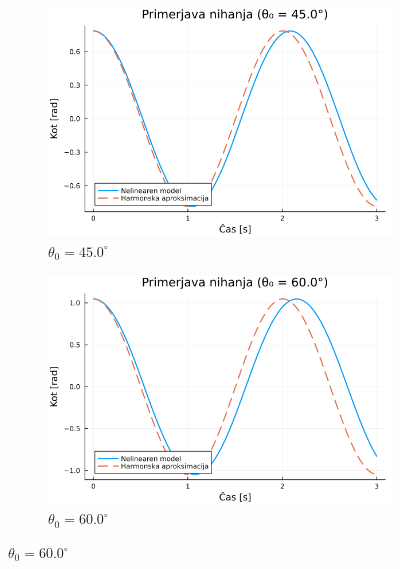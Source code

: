 \documentclass{article}
\begin{document}
\begin{figure}[h!]
    \begin{subfigure}[b]{0.49\textwidth}
        \includegraphics[width=\textwidth]{../slike/primerjava_0.79.png}
        \caption{$\theta_0 = 45.0^\circ$}
        \label{fig:comp45}
    \end{subfigure}
    \hfill
    \begin{subfigure}[b]{0.49\textwidth}
        \includegraphics[width=\textwidth]{../slike/primerjava_1.05.png}
        \caption{$\theta_0 = 60.0^\circ$}
        \label{fig:comp60}
    \end{subfigure}
    
    \vspace{1cm}
    

\end{figure}
\end{document}
